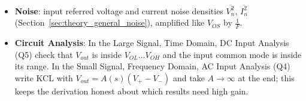 \begin{itemize}
    \begin{itemize}
      \item \textbf{Offset} \(V_{OS}\): the \(V_{id}\) needed to bring
        \(V_{out}\) to its intended value. It appears in series with \(V_+\),
        so it is amplified by \(\frac{1}{F}\).
      \item \textbf{Bias Currents} \(I_{B+}\), \(I_{B-}\) flow into the
        inputs; \(I_{OS} = |I_{B+} - I_{B-}|\).
      \item \textbf{Common Mode Rejection}: with
        \(V_{ic} = \frac{V_+ + V_-}{2}\),
        \begin{align*}
          V_{out} &= A_d V_{id} + A_c V_{ic} \hspace{1cm}
          CMRR = \frac{A_d}{A_c}
        \end{align*}
      \item \textbf{Power Supply Rejection}:
        \(PSRR = \frac{A_d}{V_{out}/V_{dd}}\), the gain from the input divided
        by the gain from the supply.
    \end{itemize}
  \item \textbf{Noise}: input referred voltage and current noise densities \(\overline{V_n^2}\), \(\overline{I_n^2}\)
    (Section~\ref{sec:theory_general_noise}), amplified like \(V_{OS}\) by \(\frac{1}{F}\).
  \item \textbf{Circuit Analysis}: In the Large Signal, Time Domain, DC
    Input Analysis (Q5) check that \(V_{out}\) is inside
    \(V_{OL} \ldots V_{OH}\) and the input common mode is inside its range.
    In the Small Signal, Frequency Domain, AC Input Analysis (Q4) write KCL with \(V_{out} = A(s)(V_+ - V_-)\) and take
    \(A \to \infty\) at the end; this keeps the derivation honest about
    which results need high gain.
\end{itemize}
